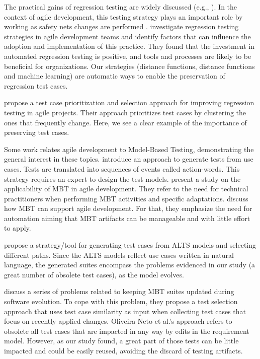 
The practical gains of regression testing are widely discussed (e.g., \citep{aiken1991multiple,leung1989insights,wong1997study,ekelund2015efficient}). In the context of agile development, this testing strategy plays an important role by working as safety nets changes are performed \citep{martin2002agile}. \citet{parsons2014influences} investigate regression testing strategies in agile development teams and identify factors that can influence the adoption and implementation of this practice. They found that the investment in automated regression testing is positive, and tools and processes are likely to be beneficial for organizations. Our strategies (distance functions, distance functions and machine learning) are automatic ways to enable the preservation of regression test cases. 

\citet{ali2019enhanced} propose a test case prioritization and selection approach for improving regression testing in agile projects. Their approach prioritizes test cases by clustering the ones that frequently change. Here, we see a clear example of the importance of preserving test cases. 

Some work relates agile development to Model-Based Testing, demonstrating the general interest in these topics. \citet{katara2006making} introduce an approach to generate tests from use cases. Tests are translated into sequences of events called action-words. This strategy requires an expert to design the test models. \citet{puolitaival2008adapting} present a study on the applicability of MBT in agile development. They refer to the need for technical practitioners when performing MBT activities and specific adaptations. \citet{katara2006making} discuss how MBT can support agile development. For that, they emphasize the need for automation aiming that MBT artifacts can be manageable and with little effort to apply.

\citet{cartaxo2008lts}
 propose a strategy/tool for generating test cases from ALTS models and selecting different paths. Since the ALTS models reflect use cases written in natural language, the generated suites encompass the problems evidenced in our study (a great number of obsolete test cases), as the model evolves.

\citet{de2016full} discuss a series of problems related to keeping MBT suites updated during software evolution. To cope with this problem, they propose a test selection approach that uses test case similarity as input when collecting test cases that focus on recently applied changes. Oliveira Neto et al.'s approach refers to obsolete all test cases that are impacted in any way by edits in the requirement model. However, as our study found, a great part of those tests can be little impacted and could be easily reused, avoiding the discard of testing artifacts. 


